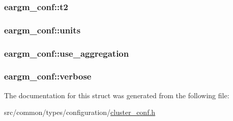 \subsubsection[{\texorpdfstring{t2}{t2}}]{ eargm\+\_\+conf\+::t2}\hypertarget{structeargm__conf_aaa8c95724df6bffde492a8519e79d230}{}\label{structeargm__conf_aaa8c95724df6bffde492a8519e79d230}
\subsubsection[{\texorpdfstring{units}{units}}]{ eargm\+\_\+conf\+::units}\hypertarget{structeargm__conf_a03716673397e97334c320454b2e37016}{}\label{structeargm__conf_a03716673397e97334c320454b2e37016}
\subsubsection[{\texorpdfstring{use\+\_\+aggregation}{use_aggregation}}]{ eargm\+\_\+conf\+::use\+\_\+aggregation}\hypertarget{structeargm__conf_ae7a047cf5c87ba13ea283afd17ca9a54}{}\label{structeargm__conf_ae7a047cf5c87ba13ea283afd17ca9a54}
\subsubsection[{\texorpdfstring{verbose}{verbose}}]{ eargm\+\_\+conf\+::verbose}\hypertarget{structeargm__conf_a36bcc8aa5b1f1367ff001518149a789f}{}\label{structeargm__conf_a36bcc8aa5b1f1367ff001518149a789f}


The documentation for this struct was generated from the following file\+:\begin{DoxyCompactItemize}
\item 
src/common/types/configuration/\hyperlink{cluster__conf_8h}{cluster\+\_\+conf.\+h}\end{DoxyCompactItemize}
